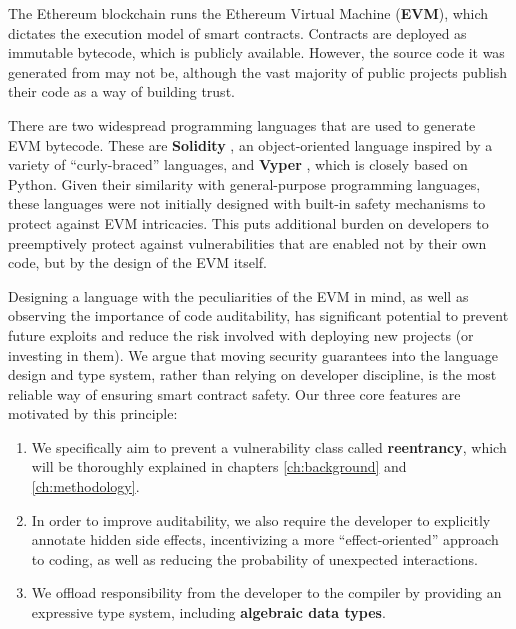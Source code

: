 \par
The Ethereum blockchain runs the Ethereum Virtual Machine (\textbf{EVM}), which dictates the execution model of smart contracts. Contracts are deployed as immutable bytecode, which is publicly available. However, the source code it was generated from may not be, although the vast majority of public projects publish their code as a way of building trust.
\par
There are two widespread programming languages that are used to generate EVM bytecode. These are \textbf{Solidity} \cite{solidity}, an object-oriented language inspired by a variety of ``curly-braced'' languages, and \textbf{Vyper} \cite{vyper}, which is closely based on Python. Given their similarity with general-purpose programming languages, these languages were not initially designed with built-in safety mechanisms to protect against EVM intricacies. This puts additional burden on developers to preemptively protect against vulnerabilities that are enabled not by their own code, but by the design of the EVM itself.
\par
Designing a language with the peculiarities of the EVM in mind, as well as observing the importance of code auditability, has significant potential to prevent future exploits and reduce the risk involved with deploying new projects (or investing in them). We argue that moving security guarantees into the language design and type system, rather than relying on developer discipline, is the most reliable way of ensuring smart contract safety. Our three core features are motivated by this principle:

\begin{enumerate}
  \item We specifically aim to prevent a vulnerability class called \textbf{reentrancy}, which will be thoroughly explained in chapters \ref{ch:background} and \ref{ch:methodology}.
  \item  In order to improve auditability, we also require the developer to explicitly annotate hidden side effects, incentivizing a more ``effect-oriented'' approach to coding, as well as reducing the probability of unexpected interactions.
  \item We offload responsibility from the developer to the compiler by providing an expressive type system, including \textbf{algebraic data types}.
\end{enumerate}

